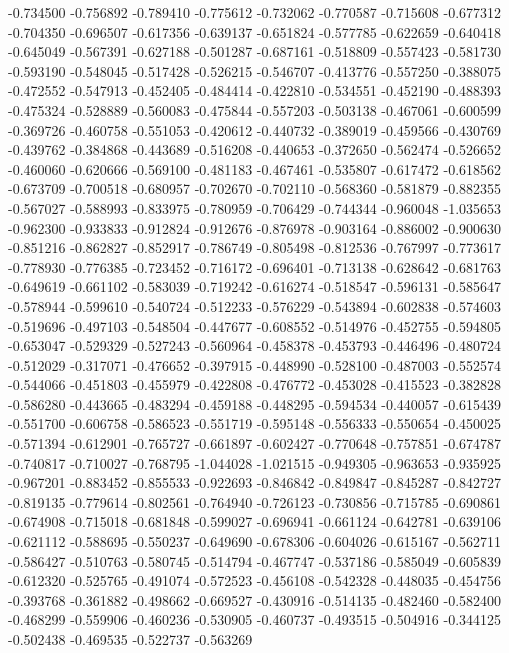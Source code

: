 -0.734500
-0.756892
-0.789410
-0.775612
-0.732062
-0.770587
-0.715608
-0.677312
-0.704350
-0.696507
-0.617356
-0.639137
-0.651824
-0.577785
-0.622659
-0.640418
-0.645049
-0.567391
-0.627188
-0.501287
-0.687161
-0.518809
-0.557423
-0.581730
-0.593190
-0.548045
-0.517428
-0.526215
-0.546707
-0.413776
-0.557250
-0.388075
-0.472552
-0.547913
-0.452405
-0.484414
-0.422810
-0.534551
-0.452190
-0.488393
-0.475324
-0.528889
-0.560083
-0.475844
-0.557203
-0.503138
-0.467061
-0.600599
-0.369726
-0.460758
-0.551053
-0.420612
-0.440732
-0.389019
-0.459566
-0.430769
-0.439762
-0.384868
-0.443689
-0.516208
-0.440653
-0.372650
-0.562474
-0.526652
-0.460060
-0.620666
-0.569100
-0.481183
-0.467461
-0.535807
-0.617472
-0.618562
-0.673709
-0.700518
-0.680957
-0.702670
-0.702110
-0.568360
-0.581879
-0.882355
-0.567027
-0.588993
-0.833975
-0.780959
-0.706429
-0.744344
-0.960048
-1.035653
-0.962300
-0.933833
-0.912824
-0.912676
-0.876978
-0.903164
-0.886002
-0.900630
-0.851216
-0.862827
-0.852917
-0.786749
-0.805498
-0.812536
-0.767997
-0.773617
-0.778930
-0.776385
-0.723452
-0.716172
-0.696401
-0.713138
-0.628642
-0.681763
-0.649619
-0.661102
-0.583039
-0.719242
-0.616274
-0.518547
-0.596131
-0.585647
-0.578944
-0.599610
-0.540724
-0.512233
-0.576229
-0.543894
-0.602838
-0.574603
-0.519696
-0.497103
-0.548504
-0.447677
-0.608552
-0.514976
-0.452755
-0.594805
-0.653047
-0.529329
-0.527243
-0.560964
-0.458378
-0.453793
-0.446496
-0.480724
-0.512029
-0.317071
-0.476652
-0.397915
-0.448990
-0.528100
-0.487003
-0.552574
-0.544066
-0.451803
-0.455979
-0.422808
-0.476772
-0.453028
-0.415523
-0.382828
-0.586280
-0.443665
-0.483294
-0.459188
-0.448295
-0.594534
-0.440057
-0.615439
-0.551700
-0.606758
-0.586523
-0.551719
-0.595148
-0.556333
-0.550654
-0.450025
-0.571394
-0.612901
-0.765727
-0.661897
-0.602427
-0.770648
-0.757851
-0.674787
-0.740817
-0.710027
-0.768795
-1.044028
-1.021515
-0.949305
-0.963653
-0.935925
-0.967201
-0.883452
-0.855533
-0.922693
-0.846842
-0.849847
-0.845287
-0.842727
-0.819135
-0.779614
-0.802561
-0.764940
-0.726123
-0.730856
-0.715785
-0.690861
-0.674908
-0.715018
-0.681848
-0.599027
-0.696941
-0.661124
-0.642781
-0.639106
-0.621112
-0.588695
-0.550237
-0.649690
-0.678306
-0.604026
-0.615167
-0.562711
-0.586427
-0.510763
-0.580745
-0.514794
-0.467747
-0.537186
-0.585049
-0.605839
-0.612320
-0.525765
-0.491074
-0.572523
-0.456108
-0.542328
-0.448035
-0.454756
-0.393768
-0.361882
-0.498662
-0.669527
-0.430916
-0.514135
-0.482460
-0.582400
-0.468299
-0.559906
-0.460236
-0.530905
-0.460737
-0.493515
-0.504916
-0.344125
-0.502438
-0.469535
-0.522737
-0.563269

